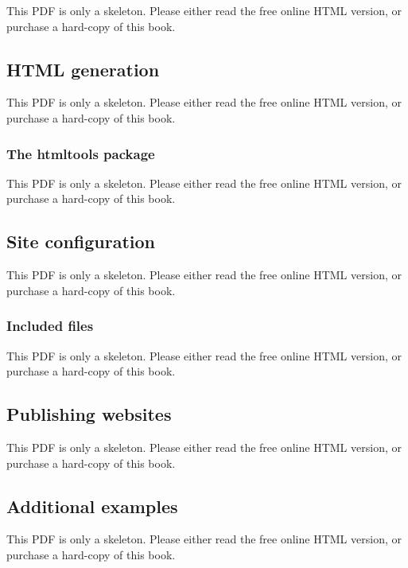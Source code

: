 \documentclass[
  11pt,
]{krantz}
\theoremstyle{definition}
\theoremstyle{definition}
\theoremstyle{definition}
\theoremstyle{definition}
\theoremstyle{remark}
\begin{document}
This PDF is only a skeleton. Please either read the free online HTML version, or purchase a hard-copy of this book.

\subsection{HTML generation}\label{html-generation}

This PDF is only a skeleton. Please either read the free online HTML version, or purchase a hard-copy of this book.

\subsubsection{The htmltools package}\label{the-htmltools-package}

This PDF is only a skeleton. Please either read the free online HTML version, or purchase a hard-copy of this book.

\subsection{Site configuration}\label{site-configuration}

This PDF is only a skeleton. Please either read the free online HTML version, or purchase a hard-copy of this book.

\subsubsection{Included files}\label{included-files}

This PDF is only a skeleton. Please either read the free online HTML version, or purchase a hard-copy of this book.

\subsection{Publishing websites}\label{publishing-websites}

This PDF is only a skeleton. Please either read the free online HTML version, or purchase a hard-copy of this book.

\subsection{Additional examples}\label{additional-examples}

This PDF is only a skeleton. Please either read the free online HTML version, or purchase a hard-copy of this book.
\end{document}
